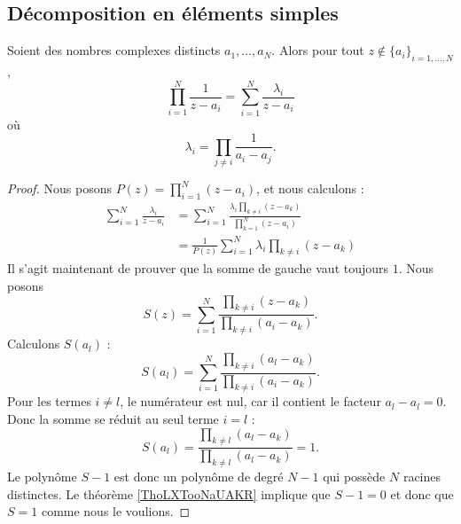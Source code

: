 \subsection{Décomposition en éléments simples}
\label{SUBSECooSIYXooDDHUdD}


\begin{lemma}     \label{LEMooABJMooJTUpgV}
	Soient des nombres complexes distincts \( a_1,\ldots, a_N\). Alors pour tout \( z\notin\{ a_i \}_{i=1,\ldots, N}\),
	\begin{equation}
		\prod_{i=1}^N  \frac{1}{z-a_i }=\sum_{i=1}^N\frac{ \lambda_i }{ z-a_i }
	\end{equation}
	où
	\begin{equation}
		\lambda_i=\prod_{j\neq i}\frac{1}{ a_i-a_j }.
	\end{equation}
\end{lemma}

\begin{proof}
	Nous posons \( P(z)=\prod_{i=1}^N(z-a_i)\), et nous calculons :
	\begin{subequations}
		\begin{align}
			\sum_{i=1}^N\frac{ \lambda_i }{ z-a_i } & =  \sum_{i=1}^N\frac{ \lambda_i\prod_{k\neq i}(z-a_k) }{ \prod_{k=1}^N(z-a_i) } \\
			                                        & =  \frac{1}{ P(z) }\sum_{i=1}^N\lambda_i\prod_{k\neq i}(z-a_k)
		\end{align}
	\end{subequations}
	Il s'agit maintenant de prouver que la somme de gauche vaut toujours \( 1\). Nous posons
	\begin{equation}
		S(z)=\sum_{i=1}^N\frac{ \prod_{k\neq i}(z-a_k) }{ \prod_{k\neq i}(a_i-a_k) }.
	\end{equation}
	Calculons \( S(a_l)\) :
	\begin{equation}
		S(a_l)=\sum_{i=1}^N\frac{ \prod_{k\neq i}(a_l-a_k) }{ \prod_{k\neq i}(a_i-a_k) }.
	\end{equation}
	Pour les termes \( i\neq l\), le numérateur est nul, car il contient le facteur \( a_l-a_l=0\). Donc la somme se réduit au seul terme \( i=l\) :
	\begin{equation}
		S(a_l)=\frac{ \prod_{k\neq l}(a_l-a_k) }{ \prod_{k\neq l}(a_l-a_k) }=1.
	\end{equation}
	Le polynôme \( S-1\) est donc un polynôme de degré \( N-1\) qui possède \( N\) racines distinctes. Le théorème \ref{ThoLXTooNaUAKR} implique que \( S-1=0\) et donc que \( S=1\) comme nous le voulions.
\end{proof}

